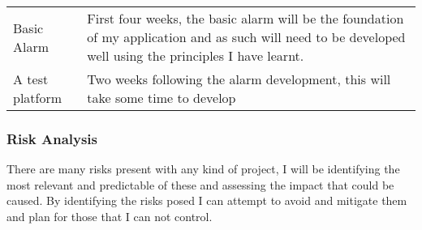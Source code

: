 \begin{longtable}[]{@{}ll@{}}
\begin{minipage}[t]{0.20\columnwidth}
Basic Alarm\strut
\end{minipage} & \begin{minipage}[t]{0.74\columnwidth}\raggedright\strut
First four weeks, the basic alarm will be the foundation of my
application and as such will need to be developed well using the
principles I have learnt.\strut
\end{minipage}\tabularnewline
\begin{minipage}[t]{0.20\columnwidth}\raggedright\strut
A test platform\strut
\end{minipage} & \begin{minipage}[t]{0.74\columnwidth}\raggedright\strut
Two weeks following the alarm development, this will take some time to
develop\strut
\end{minipage}\tabularnewline
\bottomrule
\end{longtable}

\subsubsection{Risk Analysis}\label{risk-analysis}

There are many risks present with any kind of project, I will be
identifying the most relevant and predictable of these and assessing the
impact that could be caused. By identifying the risks posed I can
attempt to avoid and mitigate them and plan for those that I can not
control.

